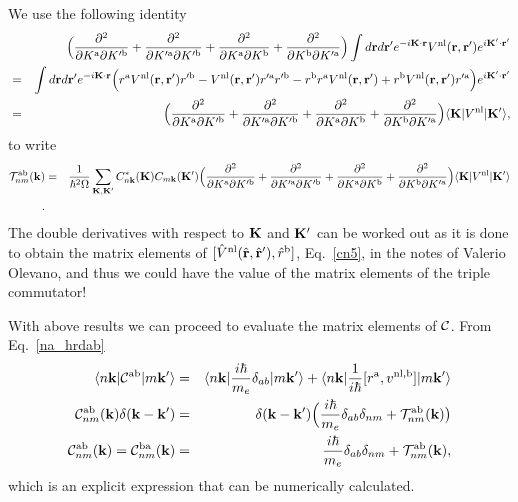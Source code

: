 We use the following identity
\begin{eqnarray}\label{3.4}
&&
\Big(
\frac{\partial^2}{\partial K^{\mathrm{a}}\partial K'^{\mathrm{b}}}
+
\frac{\partial^2}{\partial K'^{\mathrm{a}}\partial K'^{\mathrm{b}}}
+
\frac{\partial^2}{\partial K^{\mathrm{a}}\partial K^{\mathrm{b}}}
+
\frac{\partial^2}{\partial K^{\mathrm{b}}\partial K'^{\mathrm{a}}}
\Big)
\int
d\mathbf{r} d\mathbf{r}'
 e^{-i\mathbf{K}\cdot\mathbf{r}}
V^{\mathrm{nl}}(\mathbf{r},\mathbf{r}')
e^{i\mathbf{K}'\cdot\mathbf{r}'}
\nonumber\\
&=&
\int d\mathbf{r} d\mathbf{r}'
 e^{-i\mathbf{K}\cdot\mathbf{r}}
\Big( 
r^{\mathrm{a}} 
V^{\mathrm{nl}}(\mathbf{r},\mathbf{r}') 
r'^{\mathrm{b}}
- 
V^{\mathrm{nl}}(\mathbf{r},\mathbf{r}') 
r'^{\mathrm{a}} 
r'^{\mathrm{b}}
- 
r^{\mathrm{b}} 
r^{\mathrm{a}} 
V^{\mathrm{nl}}(\mathbf{r},\mathbf{r}')
+
 r^{\mathrm{b}} 
V^{\mathrm{nl}}(\mathbf{r},\mathbf{r}') 
r'^{\mathrm{a}}
\Big)  
e^{i\mathbf{K}'\cdot\mathbf{r}'}
\nonumber\\
&=&
\Big(
\frac{\partial^2}{\partial K^{\mathrm{a}}\partial K'^{\mathrm{b}}}
+
\frac{\partial^2}{\partial K'^{\mathrm{a}}\partial K'^{\mathrm{b}}}
+
\frac{\partial^2}{\partial K^{\mathrm{a}}\partial K^{\mathrm{b}}}
+
\frac{\partial^2}{\partial K^{\mathrm{b}}\partial K'^{\mathrm{a}}}
\Big)
\langle \mathbf{K} | 
V^{\mathrm{nl}}
| \mathbf{K}' \rangle 
,
\end{eqnarray}
to write
\begin{eqnarray}\label{3.7}
{\cal T}^{\mathrm{a}\mathrm{b}}_{nm}(\mathbf{k})
&=&
\frac{1}{\hbar^2\Omega}
\sum_{\mathbf{K},\mathbf{K}'} 
C^*_{n\mathbf{k}}(\mathbf{K}) 
C_{m\mathbf{k}}(\mathbf{K}')
\Big(
\frac{\partial^2}{\partial K^{\mathrm{a}}\partial K'^{\mathrm{b}}}
+
\frac{\partial^2}{\partial K'^{\mathrm{a}}\partial K'^{\mathrm{b}}}
+
\frac{\partial^2}{\partial K^{\mathrm{a}}\partial K^{\mathrm{b}}}
+
\frac{\partial^2}{\partial K^{\mathrm{b}}\partial K'^{\mathrm{a}}}
\Big)
\langle \mathbf{K} | 
V^{\mathrm{nl}}
| \mathbf{K}' \rangle 
\nonumber\\
.
\end{eqnarray} 
The double derivatives with respect to $\mathbf{K}$ and $\mathbf{K}'$ can be worked out as
it is done to obtain the matrix elements of
$[\hat V^{\mathrm{nl}}(\hat{\mathbf{r}},\hat{\mathbf{r}}'),\hat r^{\mathrm{b}}]$, 
Eq.~\eqref{cn5}, 
in the notes of Valerio Olevano,\cite{cual}
and thus we
could have the value of the matrix elements of the triple commutator!

With above results we can proceed to evaluate the matrix elements of ${\mathbf{\cal C}}$.
From Eq.~\eqref{na_hrdab}
\begin{eqnarray}\label{na_hrdabn}
\langle n\mathbf{k} |
{\mathbf{\cal C}}^{\mathrm{a}\mathrm{b}}
| m\mathbf{k}' \rangle
&=&
\langle n\mathbf{k} |
\frac{i\hbar}{m_e}\delta_{ab}
| m\mathbf{k}' \rangle
+
\langle n\mathbf{k} |
\frac{1}{i\hbar}[r^{\mathrm{a}},v^{\mathrm{nl},\mathrm{b}}]
| m\mathbf{k}' \rangle
\nonumber\\
{\mathbf{\cal C}}^{\mathrm{a}\mathrm{b}}_{nm}(\mathbf{k})
\delta(\mathbf{k}-\mathbf{k}')
&=&
\delta(\mathbf{k}-\mathbf{k}')
\Big(
\frac{i\hbar}{m_e}\delta_{ab}\delta_{nm}
+
{\cal T}_{nm}^{\mathrm{a}\mathrm{b}}(\mathbf{k})\big)
\nonumber\\
{\mathbf{\cal C}}^{\mathrm{a}\mathrm{b}}_{nm}(\mathbf{k})
={\mathbf{\cal C}}^{\mathrm{b}\mathrm{a}}_{nm}(\mathbf{k})
&=&
\frac{i\hbar}{m_e}\delta_{ab}\delta_{nm}
+
{\cal T}_{nm}^{\mathrm{a}\mathrm{b}}(\mathbf{k})
,
\end{eqnarray}
which is an explicit expression that can be numerically calculated.
